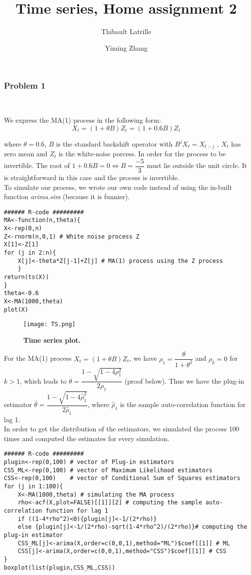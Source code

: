 \documentclass{article}
\author{Thibault Latrille \and Yiming Zhang}
\title{Time series, Home assignment 2}
\begin{document}
\maketitle

\subsubsection*{Problem 1}
\

We express the MA(1) process in the following form:
\[
X_{t}=(1+\theta B)Z_{t}=(1+0.6B)Z_{t}
\]


where $\theta=0.6$, $B$ is the standard backshift operator with $B^{j}X_{t}=X_{t-j}$
, $X_{t}$ has zero mean and $Z_{t}$ is the white-noise porcess.
In order for the process to be invertible. The root of $1+0.6B=0 \iff B=\dfrac{-5}{3}$
must lie outside the unit circle. It is straightforward in this case and the process is invertible.
\\


To simulate our process, we wrote our own code instead of using the in-built function \emph{arima.sim} (because it is funnier).

\begin{verbatim}
###### R-code #########
MA<-function(n,theta){
X<-rep(0,n) 
Z<-rnorm(n,0,1) # White noise process Z
X[1]<-Z[1]
for (j in 2:n){
	X[j]<-theta*Z[j-1]+Z[j] # MA(1) process using the Z process
	}
return(ts(X))
}
theta<-0.6
X<-MA(1000,theta)
plot(X)
\end{verbatim}

\begin{figure}[H]
	\centering
  	\texttt{[image: TS.png]}
  	\caption{\textbf{Time series plot.} }
\end{figure}


For the MA(1) process $X_{t}=(1+\theta B)Z_{t}$, we have $\rho_1=\dfrac{\theta}{1+\theta^2}$ and $\rho_k=0$ for $k>1$, which leads to $\theta = \dfrac{1- \sqrt{1-4 \rho_1^2}}{2\rho_1}$ (proof below). Thus we have the plug-in estimator $\widehat{\theta} = \dfrac{1 - \sqrt{1-4 \widehat{\rho}_1^2}}{2\widehat{\rho}_1}$, where $\widehat{\rho}_1$ is the sample auto-correlation function for lag 1.
\\


In order to get the distribution of the estimators, we simulated the process 100 times and computed the estimates for every simulation. 
\begin{verbatim}
###### R-code #########
plugin<-rep(0,100) # vector of Plug-in estimators 
CSS_ML<-rep(0,100) # vector of Maximum Likelihood estimators
CSS<-rep(0,100)    # vector of Conditional Sum of Squares estimators 
for (j in 1:100){
	X<-MA(1000,theta) # simulating the MA process
	rho<-acf(X,plot=FALSE)[[1]][2] # computing the sample auto-correlation function for lag 1
	if ((1-4*rho^2)<0){plugin[j]<-1/(2*rho)}
	else {plugin[j]<-1/(2*rho)-sqrt(1-4*rho^2)/(2*rho)}# computing the plug-in estimator
	CSS_ML[j]<-arima(X,order=c(0,0,1),method="ML")$coef[[1]] # ML
	CSS[j]<-arima(X,order=c(0,0,1),method="CSS")$coef[[1]] # CSS
}
boxplot(list(plugin,CSS_ML,CSS))
\end{verbatim}
\end{document}
